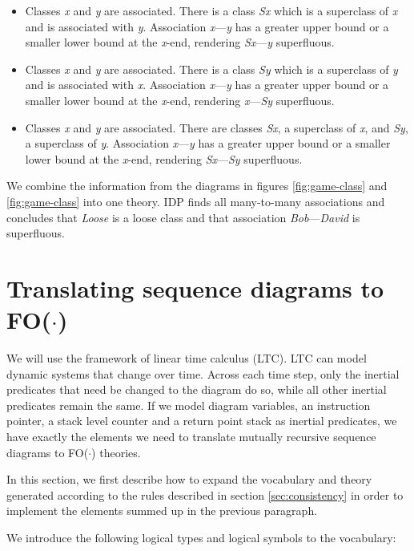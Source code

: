 \documentclass[conference]{IEEEtran}
\begin{document}
\begin{itemize}
	\item Classes \textit{x} and \textit{y} are associated. There is a class \textit{Sx} which is a superclass of \textit{x} and is associated with \textit{y}. Association \textit{x}---\textit{y} has a greater upper bound or a smaller lower bound at the \textit{x}-end, rendering \textit{Sx}---\textit{y} superfluous.
	\item Classes \textit{x} and \textit{y} are associated. There is a class \textit{Sy} which is a superclass of \textit{y} and is associated with \textit{x}. Association \textit{x}---\textit{y} has a greater upper bound or a smaller lower bound at the \textit{x}-end, rendering \textit{x}---\textit{Sy} superfluous.
	\item Classes \textit{x} and \textit{y} are associated. There are classes \textit{Sx}, a superclass of \textit{x}, and \textit{Sy}, a superclass of \textit{y}. Association \textit{x}---\textit{y} has a greater upper bound or a smaller lower bound at the \textit{x}-end, rendering \textit{Sx}---\textit{Sy} superfluous. 
\end{itemize}

We combine the information from the diagrams in figures \ref{fig:game-class} and \ref{fig:game-class} into one theory. IDP finds all many-to-many associations and concludes that \textit{Loose} is a loose class and that association \textit{Bob}---\textit{David} is superfluous.

\section{Translating sequence diagrams to FO($\cdot$)}\label{sec:seq}
We will use the framework of linear time calculus\cite{BogaertsBart2014Sdsu} (LTC). LTC can model dynamic systems that change over time. Across each time step, only the inertial predicates that need be changed to the diagram do so, while all other inertial predicates remain the same. If we model diagram variables, an instruction pointer, a stack level counter and a return point stack as inertial predicates, we have exactly the elements we need to translate mutually recursive sequence diagrams to FO($\cdot$) theories.

In this section, we first describe how to expand the vocabulary and theory generated according to the rules described in section \ref{sec:consistency} in order to implement the elements summed up in the previous paragraph.

We introduce the following logical types and logical symbols to the vocabulary:
\end{document}
